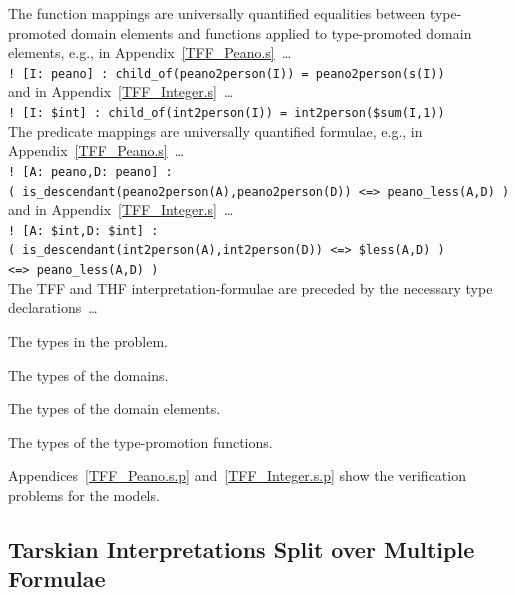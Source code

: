 \documentclass{easychair}
\newcommand{\smalltt}[1]{\small \texttt{#1}}
\newenvironment{packed_itemize}{
\vspace*{-0.3em}
\begin{itemize}
\setlength{\partopsep}{0pt}
\setlength{\itemsep}{1pt}
\setlength{\parskip}{0pt}
\setlength{\parsep}{0pt}
}{\end{itemize}}
\begin{document}
The function mappings are universally quantified equalities between type-promoted domain 
elements and functions applied to type-promoted domain elements, 
e.g., in Appendix~\ref{TFF_Peano.s}~\ldots \\
\hspace*{0.5cm}\smalltt{! [I: peano] : child\_of(peano2person(I)) = peano2person(s(I))}\\
and in Appendix~\ref{TFF_Integer.s}~\ldots\\
\hspace*{0.5cm}\smalltt{! [I: \$int] : child\_of(int2person(I)) = int2person(\$sum(I,1))}\\
The predicate mappings are universally quantified formulae, 
e.g., in Appendix~\ref{TFF_Peano.s}~\ldots \\
\hspace*{0.5cm}\smalltt{! [A: peano,D: peano] :}\\
\hspace*{1.0cm}\smalltt{( is\_descendant(peano2person(A),peano2person(D)) <=> peano\_less(A,D) )}\\
and in Appendix~\ref{TFF_Integer.s}~\ldots\\
\hspace*{0.5cm}\smalltt{! [A: \$int,D: \$int] :}\\
\hspace*{1.0cm}\smalltt{( is\_descendant(int2person(A),int2person(D)) <=> \$less(A,D) )}\\
\hspace*{0.75cm}\smalltt{<=> peano\_less(A,D) )}\\

The TFF and THF interpretation-formulae are preceded by the necessary type declarations~\ldots
\begin{packed_itemize}
\item The types in the problem.
\item The types of the domains.
\item The types of the domain elements.
\item The types of the type-promotion functions.
\end{packed_itemize}

Appendices~\ref{TFF_Peano.s.p} and~\ref{TFF_Integer.s.p} show the verification problems for the 
models.

\subsection{Tarskian Interpretations Split over Multiple Formulae}
\label{NewTarskianSplit}
\end{document}
